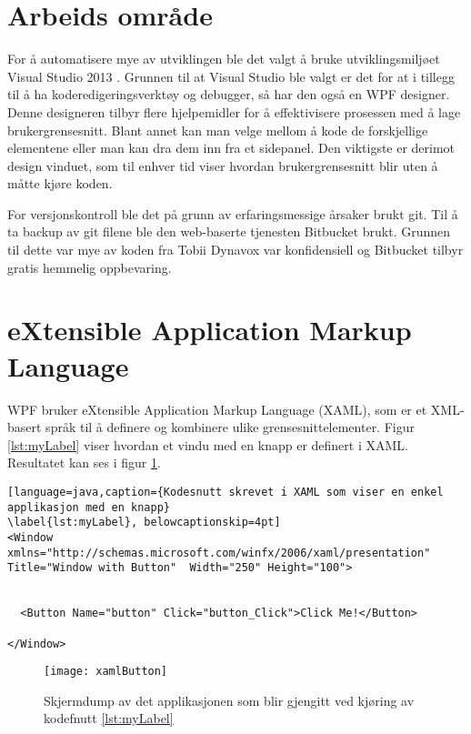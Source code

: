  
   
\section{Arbeids område} 
 
 
For å automatisere mye av utviklingen ble det valgt å bruke utviklingsmiljøet Visual Studio 2013 \cite{2013-1:online}. Grunnen til at Visual Studio ble valgt er det for at i tillegg til å ha koderedigeringsverktøy og debugger, så har den også en WPF designer\cite{What8:online}. Denne designeren tilbyr flere hjelpemidler for å effektivisere prosessen med å lage brukergrensesnitt. Blant annet kan man velge mellom å kode de forskjellige elementene eller man kan dra dem inn fra et sidepanel. Den viktigste er derimot design vinduet, som til enhver tid viser hvordan brukergrensesnitt blir uten å måtte kjøre koden\cite{WPF D1:online}. 
 
 
For versjonskontroll ble det på grunn av erfaringsmessige årsaker brukt git\cite{AboutGit:online}. Til å ta backup av git filene ble den web-baserte tjenesten Bitbucket brukt. Grunnen til dette var mye av koden fra Tobii Dynavox var konfidensiell og Bitbucket tilbyr gratis hemmelig oppbevaring. 
 
 
\section{eXtensible Application Markup Language} 
 
 
 WPF bruker eXtensible Application Markup Language (\gls{XAML}), som er et XML-basert språk til å definere og kombinere ulike grensesnittelementer. Figur \ref{lst:myLabel} viser hvordan et vindu med en knapp er definert i XAML. Resultatet kan ses i figur \ref{fig:xamlButton}.  
 
 
\begin{lstlisting}[language=java,caption={Kodesnutt skrevet i XAML som viser en enkel applikasjon med en knapp} 
\label{lst:myLabel}, belowcaptionskip=4pt] 
<Window xmlns="http://schemas.microsoft.com/winfx/2006/xaml/presentation" Title="Window with Button"  Width="250" Height="100"> 
 
 
  <Button Name="button" Click="button_Click">Click Me!</Button> 
   
</Window> 
\end{lstlisting} 
 
 
\begin{figure}[ht!] 
\centering 
\texttt{[image: xamlButton]} 
\caption{Skjermdump av det applikasjonen som blir gjengitt ved kjøring av kodefnutt \ref{lst:myLabel}} 
\label{fig:xamlButton} 
\end{figure} 
 
